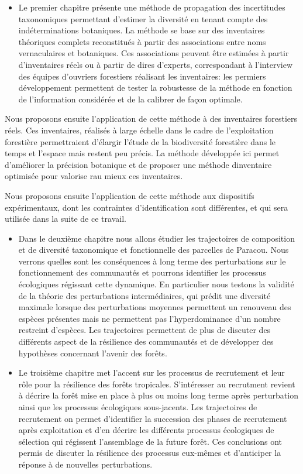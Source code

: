\documentclass[
  11pt,
  french,
  A4paper,
  extrafontsizes,onecolumn,openright
  ]{memoir}
\providecommand{\tightlist}{%
  \setlength{\itemsep}{0pt}\setlength{\parskip}{0pt}}
\begin{document}
\begin{itemize}
\tightlist
\item
  Le premier chapitre présente une méthode de propagation des
  incertitudes taxonomiques permettant d'estimer la diversité en tenant
  compte des indéterminations botaniques. La méthode se base sur des
  inventaires théoriques complets reconstitués à partir des associations
  entre noms vernaculaires et botaniques. Ces associations peuvent être
  estimées à partir d'inventaires réels ou à partir de dires d'experts,
  correspondant à l'interview des équipes d'ouvriers forestiers
  réalisant les inventaires: les permiers développement permettent de
  tester la robustesse de la méthode en fonction de l'information
  considérée et de la calibrer de façon optimale.
\end{itemize}

Nous proposons ensuite l'application de cette méthode à des inventaires
forestiers réels. Ces inventaires, réalisés à large échelle dans le
cadre de l'exploitation forestière permettraient d'élargir l'étude de la
biodiversité forestière dans le temps et l'espace mais restent peu
précis. La méthode développée ici permet d'améliorer la précision
botanique et de proposer une méthode dinventaire optimisée pour valorise
rau mieux ces inventaires.

Nous proposons ensuite l'application de cette méthode aux dispositifs
expérimentaux, dont les contraintes d'identification sont différentes,
et qui sera utilisée dans la suite de ce travail.

\begin{itemize}
\item
  Dans le deuxième chapitre nous allons étudier les trajectoires de
  composition et de diversité taxonomique et fonctionnelle des parcelles
  de Paracou. Nous verrons quelles sont les conséquences à long terme
  des perturbations sur le fonctionnement des communautés et pourrons
  identifier les processus écologiques régissant cette dynamique. En
  particulier nous testons la validité de la théorie des perturbations
  intermédiaires, qui prédit une diversité maximale lorsque des
  perturbations moyennes permettent un renouveau des espèces présentes
  mais ne permettent pas l'hyperdominance d'un nombre restreint
  d'espèces. Les trajectoires permettent de plus de discuter des
  différents aspect de la résilience des communautés et de développer
  des hypothèses concernant l'avenir des forêts.
\item
  Le troisième chapitre met l'accent sur les processus de recrutement et
  leur rôle pour la résilience des forêts tropicales. S'intéresser au
  recrutment revient à décrire la forêt mise en place à plus ou moins
  long terme après perturbation ainsi que les processus écologiques
  sous-jacents. Les trajectoires de recrutement on permet d'identifier
  la succession des phases de recrutement après exploitation et d'en
  décrire les différents processus écologiques de sélection qui
  régissent l'assemblage de la future forêt. Ces conclusions ont permis
  de discuter la résilience des processus eux-mêmes et d'anticiper la
  réponse à de nouvelles perturbations.
\end{itemize}
\end{document}
